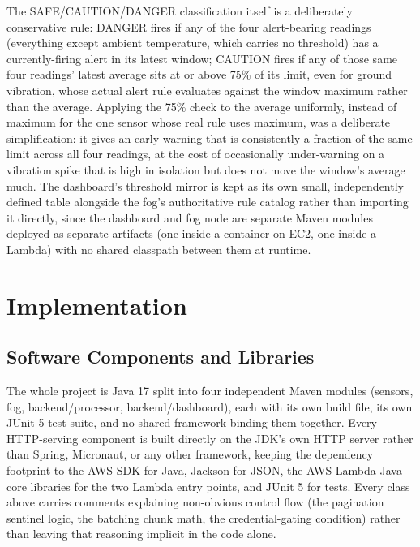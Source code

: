 \documentclass[conference]{IEEEtran}
\begin{document}
The SAFE/CAUTION/DANGER classification itself is a deliberately conservative rule: DANGER fires if any of the four alert-bearing readings (everything except ambient temperature, which carries no threshold) has a currently-firing alert in its latest window; CAUTION fires if any of those same four readings' latest average sits at or above 75\% of its limit, even for ground vibration, whose actual alert rule evaluates against the window maximum rather than the average. Applying the 75\% check to the average uniformly, instead of maximum for the one sensor whose real rule uses maximum, was a deliberate simplification: it gives an early warning that is consistently a fraction of the same limit across all four readings, at the cost of occasionally under-warning on a vibration spike that is high in isolation but does not move the window's average much. The dashboard's threshold mirror is kept as its own small, independently defined table alongside the fog's authoritative rule catalog rather than importing it directly, since the dashboard and fog node are separate Maven modules deployed as separate artifacts (one inside a container on EC2, one inside a Lambda) with no shared classpath between them at runtime.

\section{Implementation}

\subsection{Software Components and Libraries}

The whole project is Java 17 split into four independent Maven modules (sensors, fog, backend/processor, backend/dashboard), each with its own build file, its own JUnit 5 test suite, and no shared framework binding them together. Every HTTP-serving component is built directly on the JDK's own HTTP server rather than Spring, Micronaut, or any other framework, keeping the dependency footprint to the AWS SDK for Java, Jackson for JSON, the AWS Lambda Java core libraries for the two Lambda entry points, and JUnit 5 for tests. Every class above carries comments explaining non-obvious control flow (the pagination sentinel logic, the batching chunk math, the credential-gating condition) rather than leaving that reasoning implicit in the code alone.
\end{document}
